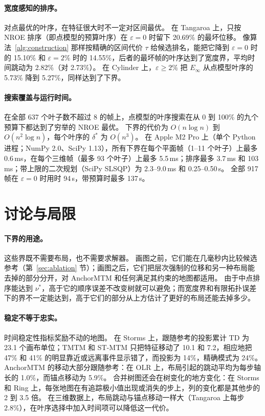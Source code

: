\documentclass[fontset=none,zihao=5,a4paper]{ctexart}
\begin{document}
\paragraph{宽度感知的排序。}
对点最优的叶序，在特征很大时不一定对区间最优。
在 Tangaroa 上，只按 NROE 排序（即点模型的预算叶序）在 $\varepsilon=0$ 时留下 20.69\% 的最坏位移。
像算法~\ref{alg:construction} 那样按精确的区间代价 $\tau$ 给候选排名，能把它降到 $\varepsilon=0$ 时的 15.10\% 和 $\varepsilon=2\%$ 时的 14.55\%，后者的最坏帧的叶序达到了宽度界，平均时间跳动为 2.82\%（对 2.73\%）。
在 Cylinder 上，$\varepsilon\ge2\%$ 把 $E_\infty$ 从点模型叶序的 5.73\% 降到 5.27\%，同样达到了下界。

\paragraph{搜索覆盖与运行时间。}
在全部 637 个叶子数不超过 8 的帧上，点模型的叶序搜索在从 0 到 100\% 的九个预算下都达到了穷举的 NROE 最优。
下界的代价为 $O(n\log n)$ 到 $O(n^2\log n)$，每个叶序的 $\delta^*$ 为 $O(n^3)$。
在 Apple M2 Pro 上（单个 Python 进程；NumPy 2.0、SciPy 1.13），所有下界在每个平面帧（1--11 个叶子）上最多 0.6\,ms，在每个三维帧（最多 93 个叶子）上最多 5.5\,ms；排序最多 3.7\,ms 和 103\,ms；带上限的二次规划（SciPy SLSQP）为 2.3--9.0\,ms 和 0.25--0.50\,s。
全部 917 帧在 $\varepsilon=0$ 时用时 94\,s，带预算时最多 137\,s。

\section{讨论与局限}\label{sec:discussion}
\paragraph{下界的用途。}
这些界既不需要布局，也不需要求解器。
画图之前，它们能在几毫秒内比较候选参考（第~\ref{sec:ablation} 节）；画图之后，它们把层次强制的位移和另一种布局能去掉的部分分开，对 AnchorMTM 和任何满足其约束的地图都适用。
由于中点排序能达到 $\nu^*$，高于它的顺序误差不改变树就可以避免；而宽度界和有限拓扑误差下的界不一定能达到，高于它们的部分从上方估计了更好的布局还能去掉多少。

\paragraph{稳定不等于忠实。}
时间稳定性指标奖励不动的地图。
在 Storms 上，跟随参考的投影累计 TD 为 23.1 个画布单位；TMTM 和 ST-MTM 只把特征移动了 10.1 和 7.2，相应地把 47\% 和 41\% 的明显靠近或远离事件显示错了，而投影为 14\%，精确模式为 24\%。
AnchorMTM 的移动大部分跟随参考：在 OLR 上，布局引起的跳动平均为每步轴长的 1.0\%，而锚点移动为 5.9\%。
合并树图还会在树变化的地方变化：在 Storms 和 Ring 上，每张地图在有追踪极小值出现或消失的步上，列的变化都是其他步的 2 到 3.5 倍。
在三维数据上，布局跳动与锚点移动一样大（Tangaroa 上每步 2.8\%），在叶序选择中加入时间项可以降低这一代价。
\end{document}
